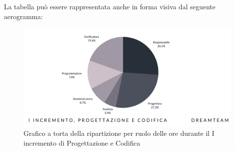 La tabella può essere rappresentata anche in forma visiva dal seguente aerogramma:
\begin{figure}[H]
\centering
\includegraphics[scale=0.50]{Sezioni/SezioniPreventivo/grafici/progettazione/Progettazione_I_incremento_costi.png}
\caption{Grafico a torta della ripartizione per ruolo delle ore durante il I incremento di Progettazione e Codifica}
\end{figure}

\pagebreak

